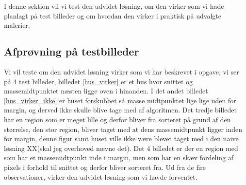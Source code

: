 {\sffamily
I denne sektion vil vi test den udvidet løsning, om den virker som vi
hade planlagt på test billeder og om hvordan den virker i praktisk på
udvalgte malerier.
}
\subsection{Afprøvning på testbilleder}
Vi vil teste om den udvidet løsning virker som vi har beskrevet i
opgave, vi ser på 4 test billeder, billedet \ref{hus_virker} er et hus
hvor snittet og massemidtpunktet næsten ligge oven i hinanden. I det
andet billedet \ref{hus_virker_ikke} er huset forskubbet så masse
midtpunktet lige lige uden for margin, og derved ikke skulle blive tage
med af algoritmen. Det tredje billedet har en region som er meget lille
og derfor bliver fra sorteret på grund af den størrelse, den stor
region, bliver taget med at dens massemidtpunkt ligger inden for margin,
denne figur samt huset ville ikke være blevet taget med i den naive
løsning XX(skal jeg overhoved nævne det). Det 4 billedet er der en
region med som har et massemidtpunkt inde i margin, men som har en skæv
fordeling af pixels i forhold til snittet og derfor bliver sorteret fra.
Ud fra de fire observationer, virker den udvidet løsning som vi havde
forventet.

